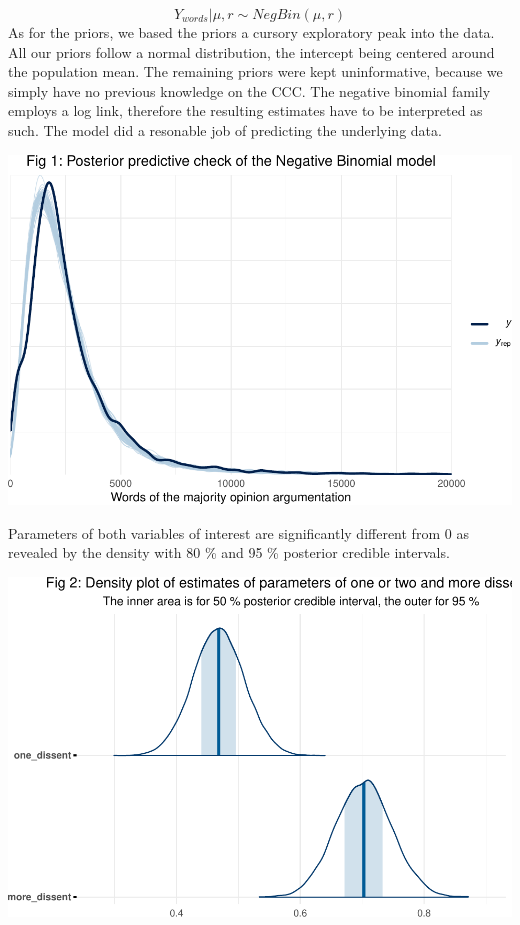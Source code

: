 \documentclass[
  11pt,
]{article}
\begin{document}
\[
Y_{words} | \mu, r \sim NegBin(\mu, r)
\] As for the priors, we based the priors a cursory exploratory peak
into the data. All our priors follow a normal distribution, the
intercept being centered around the population mean. The remaining
priors were kept uninformative, because we simply have no previous
knowledge on the CCC. The negative binomial family employs a log link,
therefore the resulting estimates have to be interpreted as such. The
model did a resonable job of predicting the underlying data.

\vspace{10pt}

\includegraphics{dissents_article-anonymised_files/figure-latex/length_pp_check-1.pdf}

Parameters of both variables of interest are significantly different
from 0 as revealed by the density with 80 \% and 95 \% posterior
credible intervals.

\vspace{10pt}

\includegraphics{dissents_article-anonymised_files/figure-latex/length_parameter_plots-1.pdf}
\end{document}
